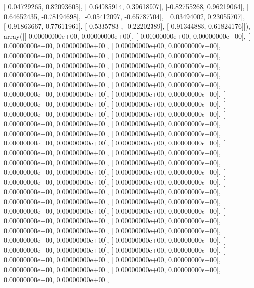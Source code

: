 \documentclass{article}
\begin{document}
       [ 0.04729265,  0.82093605],
       [ 0.64085914,  0.39618907],
       [-0.82755268,  0.96219064],
       [ 0.64652435, -0.78194698],
       [-0.05412097, -0.65787704],
       [ 0.03494002,  0.23055707],
       [-0.91863667,  0.77611961],
       [ 0.5335783 , -0.22202389],
       [ 0.91344888,  0.61824176]]), array([[  0.00000000e+00,   0.00000000e+00],
       [  0.00000000e+00,   0.00000000e+00],
       [  0.00000000e+00,   0.00000000e+00],
       [  0.00000000e+00,   0.00000000e+00],
       [  0.00000000e+00,   0.00000000e+00],
       [  0.00000000e+00,   0.00000000e+00],
       [  0.00000000e+00,   0.00000000e+00],
       [  0.00000000e+00,   0.00000000e+00],
       [  0.00000000e+00,   0.00000000e+00],
       [  0.00000000e+00,   0.00000000e+00],
       [  0.00000000e+00,   0.00000000e+00],
       [  0.00000000e+00,   0.00000000e+00],
       [  0.00000000e+00,   0.00000000e+00],
       [  0.00000000e+00,   0.00000000e+00],
       [  0.00000000e+00,   0.00000000e+00],
       [  0.00000000e+00,   0.00000000e+00],
       [  0.00000000e+00,   0.00000000e+00],
       [  0.00000000e+00,   0.00000000e+00],
       [  0.00000000e+00,   0.00000000e+00],
       [  0.00000000e+00,   0.00000000e+00],
       [  0.00000000e+00,   0.00000000e+00],
       [  0.00000000e+00,   0.00000000e+00],
       [  0.00000000e+00,   0.00000000e+00],
       [  0.00000000e+00,   0.00000000e+00],
       [  0.00000000e+00,   0.00000000e+00],
       [  0.00000000e+00,   0.00000000e+00],
       [  0.00000000e+00,   0.00000000e+00],
       [  0.00000000e+00,   0.00000000e+00],
       [  0.00000000e+00,   0.00000000e+00],
       [  0.00000000e+00,   0.00000000e+00],
       [  0.00000000e+00,   0.00000000e+00],
       [  0.00000000e+00,   0.00000000e+00],
       [  0.00000000e+00,   0.00000000e+00],
       [  0.00000000e+00,   0.00000000e+00],
       [  0.00000000e+00,   0.00000000e+00],
       [  0.00000000e+00,   0.00000000e+00],
       [  0.00000000e+00,   0.00000000e+00],
       [  0.00000000e+00,   0.00000000e+00],
       [  0.00000000e+00,   0.00000000e+00],
       [  0.00000000e+00,   0.00000000e+00],
       [  0.00000000e+00,   0.00000000e+00],
       [  0.00000000e+00,   0.00000000e+00],
       [  0.00000000e+00,   0.00000000e+00],
       [  0.00000000e+00,   0.00000000e+00],
       [  0.00000000e+00,   0.00000000e+00],
       [  0.00000000e+00,   0.00000000e+00],
       [  0.00000000e+00,   0.00000000e+00],
       [  0.00000000e+00,   0.00000000e+00],
       [  0.00000000e+00,   0.00000000e+00],
       [  0.00000000e+00,   0.00000000e+00],
       [  0.00000000e+00,   0.00000000e+00],
\end{document}

